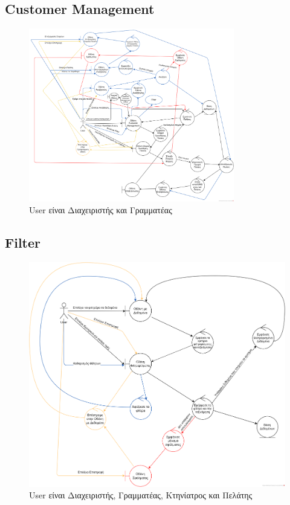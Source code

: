 \documentclass[12pt,a4paper,twoside]{book}
\begin{document}
\subsection{Customer Management}
\begin{figure}[H]
    \centering
    \includegraphics[width=0.8\textwidth]{Resources/Robustness Diagram/Customer_Management_RD.png}
    \caption{User είναι Διαχειριστής και Γραμματέας}\label{fig:robustness-customer-management}
\end{figure}

\subsection{Filter}
\begin{figure}[H]
    \centering
    \includegraphics[width=\textwidth]{Resources/Robustness Diagram/Filter_RD.png}
    \caption{User είναι Διαχειριστής, Γραμματέας, Κτηνίατρος και Πελάτης}\label{fig:robustness-filter}
\end{figure}
\end{document}
